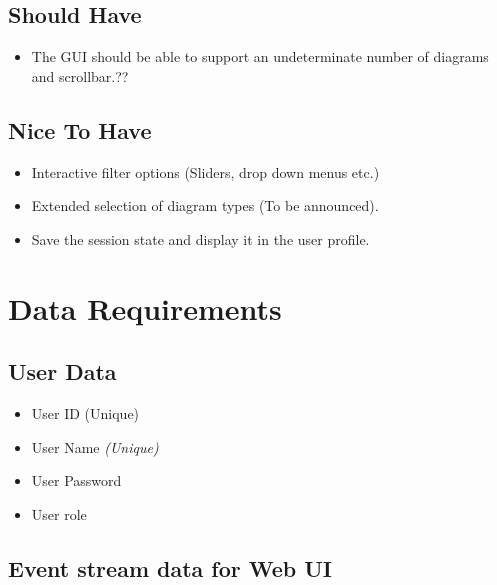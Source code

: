 \documentclass[twoside, english, draft]{Pflichtenheft}
\begin{document}
\subsection{Should Have}
\begin{itemize}
\item{The GUI should be able to support an undeterminate number of diagrams and scrollbar.??}
\end{itemize}
\subsection{Nice To Have}
\begin{itemize}
\item{Interactive filter options (Sliders, drop down menus etc.)}
\item{Extended selection of diagram types (To be announced).}
\item{Save the session state and display it in the user profile.}

\end{itemize}

\section{Data Requirements}
\subsection{User Data}
\begin{description}
\item{
	\begin{itemize}
		\item{User ID (Unique)}
		\item{ User Name \textit{(Unique)}}
		\item{ User Password}
		\item{ User \gls{role}}
	\end{itemize}
}
\end{description}

\subsection{Event stream data for Web UI}
\end{document}
